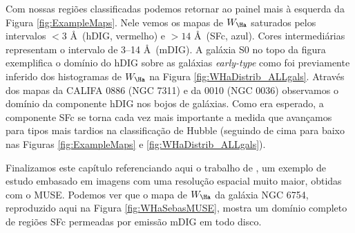 Com nossas regiões classificadas podemos retornar ao painel mais à esquerda da Figura \ref{fig:ExampleMaps}. Nele vemos os mapas de $W_{\Ha}$ saturados pelos intervalos $< 3$ \AA\ (hDIG, vermelho) e $> 14$ \AA\ (SFc, azul). Cores intermediárias representam o intervalo de 3--14 \AA\ (mDIG). A galáxia S0 no topo da figura exemplifica o domínio do hDIG sobre as galáxias {\em early-type} como foi previamente inferido dos histogramas de $W_{\Ha}$ na Figura \ref{fig:WHaDistrib_ALLgals}. Através dos mapas da CALIFA 0886 (NGC 7311) e da 0010 (NGC 0036) observamos o domínio da componente hDIG nos bojos de galáxias. Como era esperado, a componente SFc se torna cada vez mais importante a medida que avançamos para tipos mais tardios na classificação de Hubble (seguindo de cima para baixo nas Figuras \ref{fig:ExampleMaps} e \ref{fig:WHaDistrib_ALLgals}).

Finalizamos este capítulo referenciando aqui o trabalho de \citet{Sanchez.etal.2015MUSE}, um exemplo de estudo embasado em imagens com uma resolução espacial muito maior, obtidas com o MUSE. Podemos ver que o mapa de $W_{\Ha}$ da galáxia NGC 6754, reproduzido aqui na Figura \ref{fig:WHaSebasMUSE}, mostra um domínio completo de regiões SFc permeadas por emissão mDIG em todo disco.

